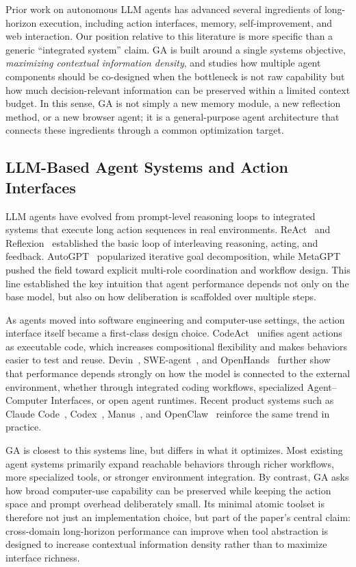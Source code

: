 Prior work on autonomous LLM agents has advanced several ingredients of long-horizon execution, including action interfaces, memory, self-improvement, and web interaction. Our position relative to this literature is more specific than a generic ``integrated system'' claim. GA is built around a single systems objective, \emph{maximizing contextual information density}, and studies how multiple agent components should be co-designed when the bottleneck is not raw capability but how much decision-relevant information can be preserved within a limited context budget. In this sense, GA is not simply a new memory module, a new reflection method, or a new browser agent; it is a general-purpose agent architecture that connects these ingredients through a common optimization target.

\subsection{LLM-Based Agent Systems and Action Interfaces}
\label{sec:related_llm_agents}

LLM agents have evolved from prompt-level reasoning loops to integrated systems that execute long action sequences in real environments. ReAct~\citep{react} and Reflexion~\citep{reflexion} established the basic loop of interleaving reasoning, acting, and feedback. AutoGPT~\citep{autogpt} popularized iterative goal decomposition, while MetaGPT~\citep{metagpt} pushed the field toward explicit multi-role coordination and workflow design. This line established the key intuition that agent performance depends not only on the base model, but also on how deliberation is scaffolded over multiple steps.

As agents moved into software engineering and computer-use settings, the action interface itself became a first-class design choice. CodeAct~\citep{codeact} unifies agent actions as executable code, which increases compositional flexibility and makes behaviors easier to test and reuse. Devin~\citep{devin}, SWE-agent~\citep{sweagent}, and OpenHands~\citep{openhands} further show that performance depends strongly on how the model is connected to the external environment, whether through integrated coding workflows, specialized Agent--Computer Interfaces, or open agent runtimes. Recent product systems such as Claude Code~\citep{claudecode}, Codex~\citep{codex}, Manus~\citep{manus}, and OpenClaw~\citep{openclaw_rl} reinforce the same trend in practice.

GA is closest to this systems line, but differs in what it optimizes. Most existing agent systems primarily expand reachable behaviors through richer workflows, more specialized tools, or stronger environment integration. By contrast, GA asks how broad computer-use capability can be preserved while keeping the action space and prompt overhead deliberately small. Its minimal atomic toolset is therefore not just an implementation choice, but part of the paper's central claim: cross-domain long-horizon performance can improve when tool abstraction is designed to increase contextual information density rather than to maximize interface richness.

